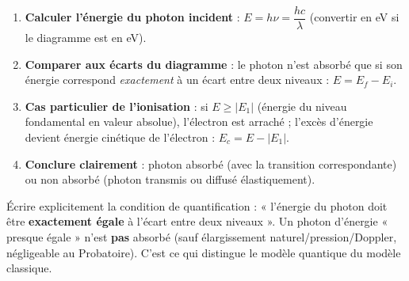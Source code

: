 \documentclass[11pt]{article}
\begin{document}
\begin{methode}
\begin{enumerate}
\item \textbf{Calculer l'énergie du photon incident} : $E = h\nu = \dfrac{hc}{\lambda}$ (convertir en eV si le diagramme est en eV).
\item \textbf{Comparer aux écarts du diagramme} : le photon n'est absorbé que si son énergie correspond \emph{exactement} à un écart entre deux niveaux : $E = E_f - E_i$.
\item \textbf{Cas particulier de l'ionisation} : si $E \geq |E_1|$ (énergie du niveau fondamental en valeur absolue), l'électron est arraché ; l'excès d'énergie devient énergie cinétique de l'électron : $E_c = E - |E_1|$.
\item \textbf{Conclure clairement} : photon absorbé (avec la transition correspondante) ou non absorbé (photon transmis ou diffusé élastiquement).
\end{enumerate}
\end{methode}

\begin{attention}
Écrire explicitement la condition de quantification : « l'énergie du photon doit être \textbf{exactement égale} à l'écart entre deux niveaux ». Un photon d'énergie « presque égale » n'est \textbf{pas} absorbé (sauf élargissement naturel/pression/Doppler, négligeable au Probatoire). C'est ce qui distingue le modèle quantique du modèle classique.
\end{attention}
\end{document}
